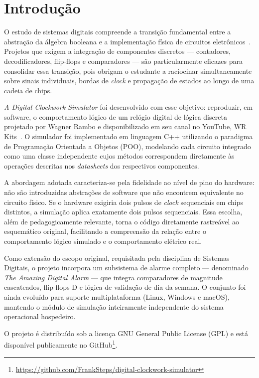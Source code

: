 \documentclass[12pt]{article}
\begin{document}
\section{Introdução}

O estudo de sistemas digitais compreende a transição fundamental entre a abstração da álgebra booleana e a implementação física de circuitos eletrônicos~\cite{tocci}. Projetos que exigem a integração de componentes discretos — contadores, decodificadores, flip-flops e comparadores — são particularmente eficazes para consolidar essa transição, pois obrigam o estudante a raciocinar simultaneamente sobre sinais individuais, bordas de \textit{clock} e propagação de estados ao longo de uma cadeia de chips.

\textit{A Digital Clockwork Simulator} foi desenvolvido com esse objetivo: reproduzir, em software, o comportamento lógico de um relógio digital de lógica discreta projetado por Wagner Rambo e disponibilizado em seu canal no YouTube, WR Kits~\cite{rambo:15}. O simulador foi implementado em linguagem C++ utilizando o paradigma de Programação Orientada a Objetos (POO), modelando cada circuito integrado como uma classe independente cujos métodos correspondem diretamente às operações descritas nos \textit{datasheets} dos respectivos componentes.

A abordagem adotada caracteriza-se pela fidelidade ao nível de pino do hardware: não são introduzidas abstrações de software que não encontrem equivalente no circuito físico. Se o hardware exigiria dois pulsos de \textit{clock} sequenciais em chips distintos, a simulação aplica exatamente dois pulsos sequenciais. Essa escolha, além de pedagogicamente relevante, torna o código diretamente rastreável ao esquemático original, facilitando a compreensão da relação entre o comportamento lógico simulado e o comportamento elétrico real.

Como extensão do escopo original, requisitada pela disciplina de Sistemas Digitais, o projeto incorpora um subsistema de alarme completo — denominado \textit{The Amazing Digital Alarm} — que integra comparadores de magnitude cascateados, flip-flops D e lógica de validação de dia da semana. O conjunto foi ainda evoluído para suporte multiplataforma (Linux, Windows e macOS), mantendo o módulo de simulação inteiramente independente do sistema operacional hospedeiro.

O projeto é distribuído sob a licença GNU General Public License (GPL) e está disponível publicamente no GitHub\footnote{\url{https://github.com/FrankSteps/digital-clockwork-simulator}}.
\end{document}
